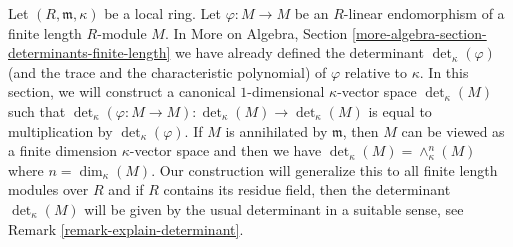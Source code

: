 \medskip\noindent
Let $(R, \mathfrak m, \kappa)$ be a local ring. Let
$\varphi : M \to M$ be an $R$-linear endomorphism of
a finite length $R$-module $M$. In More on Algebra, Section
\ref{more-algebra-section-determinants-finite-length}
we have already defined the determinant $\det_\kappa(\varphi)$
(and the trace and the characteristic polynomial)
of $\varphi$ relative to $\kappa$. In this section, we will
construct a canonical $1$-dimensional $\kappa$-vector space
$\det_\kappa(M)$ such that
$\det_\kappa(\varphi : M \to M) : \det_\kappa(M) \to \det_\kappa(M)$
is equal to multiplication by $\det_\kappa(\varphi)$.
If $M$ is annihilated by $\mathfrak m$, then $M$ can be viewed
as a finite dimension $\kappa$-vector space and then we have
$\det_\kappa(M) = \wedge^n_\kappa(M)$ where $n = \dim_\kappa(M)$.
Our construction will generalize this to all finite length modules
over $R$ and if $R$ contains its residue field, then the determinant
$\det_\kappa(M)$ will be given by the usual determinant in a suitable
sense, see Remark \ref{remark-explain-determinant}.

